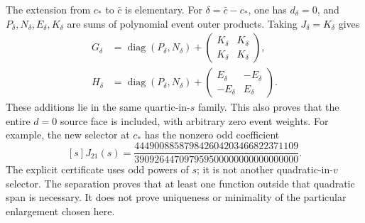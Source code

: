 \documentclass[10pt]{article}
\newcommand{\diag}{\operatorname{diag}}
\begin{document}
The extension from $c_*$ to $\bar c$ is elementary. For $\delta=\bar c-c_*$,
one has $d_\delta=0$, and $P_\delta,N_\delta,E_\delta,K_\delta$ are sums of
polynomial event outer products. Taking $J_\delta=K_\delta$ gives
\begin{align*}
G_\delta&=\diag(P_\delta,N_\delta)
    +\begin{pmatrix}K_\delta&K_\delta\\K_\delta&K_\delta\end{pmatrix},\\
H_\delta&=\diag(P_\delta,N_\delta)
    +\begin{pmatrix}E_\delta&-E_\delta\\-E_\delta&E_\delta\end{pmatrix}.
\end{align*}
These additions lie in the same quartic-in-$s$ family. This also proves that
the entire $d=0$ source face is included, with arbitrary zero event weights.
For example, the new selector at $c_*$ has the nonzero odd coefficient
\[
[s]J_{21}(s)=
\frac{444900885879842604203466822371109}
     {390926447097959500000000000000000}.
\]
The explicit certificate uses odd powers of $s$; it is not another
quadratic-in-$v$ selector. The separation proves that at least one function
outside that quadratic span is necessary. It does not prove uniqueness or
minimality of the particular enlargement chosen here.
\end{document}
